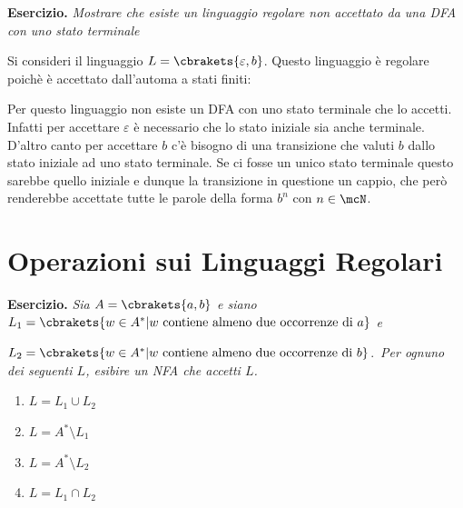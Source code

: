 \textbf{Esercizio. } \textit{Mostrare che esiste un linguaggio regolare non accettato da una DFA con uno stato terminale}

Si consideri il linguaggio \(L=\cbrakets{\varepsilon, b}\). Questo linguaggio è regolare poichè è accettato dall'automa a stati finiti:

\begin{figure}[ht]
    \centering
\end{figure}

Per questo linguaggio non esiste un DFA con uno stato terminale che lo accetti. Infatti per accettare \(\varepsilon\) è necessario che lo stato iniziale sia anche terminale. D'altro canto per accettare \(b\) c'è bisogno di una transizione che valuti \(b\) dallo stato iniziale ad uno stato terminale. Se ci fosse un unico stato terminale questo sarebbe quello iniziale e dunque la transizione in questione un cappio, che però renderebbe accettate tutte le parole della forma \(b^n\) con \(n \in \mcN\).

\newpage

\section{Operazioni sui Linguaggi Regolari}

\textbf{Esercizio.}\label{Esercizio NFA 2a2b} \textit{Sia \(A=\cbrakets{a,b}\) e siano \(L_1=\cbrakets{w \in A^* \vert w \text{ contiene almeno due occorrenze di } a}\) e }

\(L_2=\cbrakets{w \in A^* \vert w \text{ contiene almeno due occorrenze di } b}\).\ \textit{Per ognuno dei seguenti \(L\), esibire un NFA che accetti \(L\).}

\begin{enumerate}
    \item \(L=L_1 \cup L_2\)
    \item \(L=A^* \setminus L_1\)
    \item \(L=A^* \setminus L_2\)
    \item \(L=L_1 \cap L_2\)
\end{enumerate}

